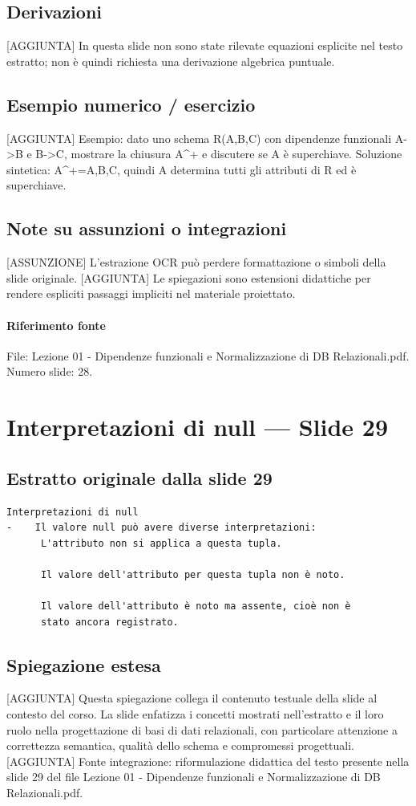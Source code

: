 \documentclass[11pt]{article}
\begin{document}
\subsection*{Derivazioni}
[AGGIUNTA] In questa slide non sono state rilevate equazioni esplicite nel testo estratto; non è quindi richiesta una derivazione algebrica puntuale.
\subsection*{Esempio numerico / esercizio}
[AGGIUNTA] Esempio: dato uno schema R(A,B,C) con dipendenze funzionali A->B e B->C, mostrare la chiusura A^+ e discutere se A è superchiave. Soluzione sintetica: A^+={A,B,C}, quindi A determina tutti gli attributi di R ed è superchiave.
\subsection*{Note su assunzioni o integrazioni}
[ASSUNZIONE] L'estrazione OCR può perdere formattazione o simboli della slide originale.
[AGGIUNTA] Le spiegazioni sono estensioni didattiche per rendere espliciti passaggi impliciti nel materiale proiettato.
\paragraph{Riferimento fonte} File: Lezione 01 - Dipendenze funzionali e Normalizzazione di DB Relazionali.pdf. Numero slide: 28.
\section{Interpretazioni di null --- Slide 29}
\subsection*{Estratto originale dalla slide 29}
\begin{lstlisting}
Interpretazioni di null
-    Il valore null può avere diverse interpretazioni:
      L'attributo non si applica a questa tupla.

      Il valore dell'attributo per questa tupla non è noto.

      Il valore dell'attributo è noto ma assente, cioè non è
      stato ancora registrato.
\end{lstlisting}
\subsection*{Spiegazione estesa}
[AGGIUNTA] Questa spiegazione collega il contenuto testuale della slide al contesto del corso. La slide enfatizza i concetti mostrati nell'estratto e il loro ruolo nella progettazione di basi di dati relazionali, con particolare attenzione a correttezza semantica, qualità dello schema e compromessi progettuali.
[AGGIUNTA] Fonte integrazione: riformulazione didattica del testo presente nella slide 29 del file Lezione 01 - Dipendenze funzionali e Normalizzazione di DB Relazionali.pdf.
\end{document}

